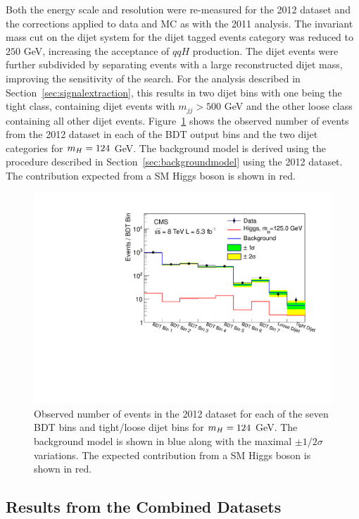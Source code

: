 Both the energy scale and resolution were re-measured for the 2012 dataset and the corrections
applied to data and MC as with the 2011 analysis. The invariant mass cut on the dijet system for 
the dijet tagged events category was reduced to $250$ GeV, increasing the acceptance of $qqH$ production.
The dijet events were further subdivided by separating events with a large reconstructed dijet mass,
improving the sensitivity of the search. For the analysis described in Section~\ref{sec:signalextraction}, 
this results in two dijet bins with one being the tight class, containing dijet events with $m_{jj}>500$ 
GeV and the other loose class containing all other dijet events.
Figure~\ref{fig:results8TeV} shows the observed number of events from the 2012 dataset in each 
of the BDT output bins and the two dijet categories for $m_{H}=124$ GeV. The background model is derived 
using the procedure described in Section~\ref{sec:backgroundmodel} using the 2012 dataset. 
The contribution expected from a SM Higgs boson is shown in red. 

\begin{figure}
\begin{center}
  \includegraphics[width=.8\textwidth]{hgg8TeV/hgg_MassWindow_model_m125_8TeV.pdf}
 \caption{Observed number of events in the 2012 dataset for each of the seven BDT bins and tight/loose dijet bins
 for $m_{H}=124$ GeV. The background model is shown in blue along with the maximal $\pm 1/2\sigma$ variations.
 The expected contribution from a SM Higgs boson is shown in red.}
\end{center}
 \label{fig:results8TeV}
\end{figure}

\subsection{Results from the Combined Datasets}
\label{sec:resultscombined}

